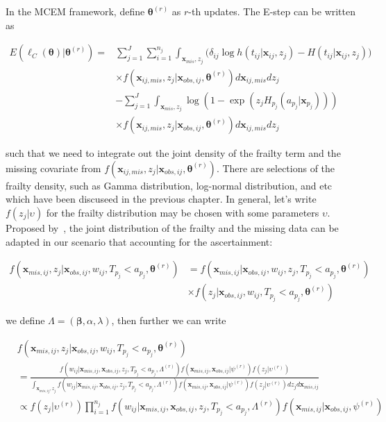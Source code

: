 \documentclass[preprint,12pt]{elsarticle}
\begin{document}
In the MCEM framework, define $\boldsymbol{\theta}^{(r)}$ as $r$-th updates. 
The E-step can be written as 

\begin{align} 
    E(\ell_C(\boldsymbol{\theta})|\boldsymbol{\theta}^{(r)})=&\sum_{j=1}^J\sum_{i=1}^{n_j}\int_{\mathbf{x}_{mis}, z_j}\Big (\delta_{ij}\log h(t_{ij}|\mathbf{x}_{ij}, z_j) - H(t_{ij}|\mathbf{x}_{ij}, z_j)\Big )\\
    &\times f(\mathbf{x}_{ij,mis}, z_j|\mathbf{x}_{obs,ij}, \boldsymbol{\theta}^{(r)})d\mathbf{x}_{ij,mis}dz_j\\
    &-\sum_{j=1}^J \int_{\mathbf{x}_{mis}, z_j} \log(1- \exp(z_j H_{p_j}(a_{p_j}|\mathbf{x}_{p_j})))\\
    &\times f(\mathbf{x}_{ij,mis}, z_j|\mathbf{x}_{obs,ij}, \boldsymbol{\theta}^{(r)})d\mathbf{x}_{ij,mis}dz_j
\end{align}

such that we need to integrate out the joint density of the frailty term and the missing covariate from $f(\mathbf{x}_{ij,mis}, z_j|\mathbf{x}_{obs,ij}, \boldsymbol{\theta}^{(r)})$. 
There are selections of the frailty density, such as Gamma distribution, log-normal distribution, and etc which have been discuseed in the previous chapter.  
In general, let's write $f(z_j|\upsilon)$ for the frailty distribution may be chosen with some parameters $\upsilon$. 
Proposed by~\citet{herring2002frailty}, the joint distribution of the frailty and the missing data can be adapted in our scenario that accounting for the ascertainment:

\begin{align} 
    f(\mathbf{x}_{mis,ij}, z_j|\mathbf{x}_{obs,ij}, w_{ij}, T_{p_j}<a_{p_j}, \boldsymbol{\theta}^{(r)})&=f(\mathbf{x}_{mis,ij}|\mathbf{x}_{obs,ij}, w_{ij}, z_j, T_{p_j}<a_{p_j}, \boldsymbol{\theta}^{(r)})\\
    &\times f(z_j|\mathbf{x}_{obs,ij}, w_{ij}, T_{p_j}<a_{p_j}, \boldsymbol{\theta}^{(r)})
\end{align}

we define $\Lambda = (\boldsymbol{\beta}, \alpha, \lambda)$, then further we can write

\begin{align} 
    &f(\mathbf{x}_{mis,ij}, z_j|\mathbf{x}_{obs,ij}, w_{ij}, T_{p_j}<a_{p_j}, \boldsymbol{\theta}^{(r)})\\
    &=\frac{f(w_{ij}|\mathbf{x}_{mis,ij}, \mathbf{x}_{obs,ij}, z_j, T_{p_j}<a_{p_j}, \Lambda^{(r)})f(\mathbf{x}_{mis,ij}, \mathbf{x}_{obs,ij}|\psi^{(r)})f(z_j|\upsilon^{(r)})}{\int_{\mathbf{x}_{mis,ij},z_j}f(w_{ij}|\mathbf{x}_{mis,ij}, \mathbf{x}_{obs,ij}, z_j, T_{p_j}<a_{p_j}, \Lambda^{(r)})f(\mathbf{x}_{mis,ij}, \mathbf{x}_{obs,ij}|\psi^{(r)})f(z_j|\upsilon^{(r)})dz_jd\mathbf{x}_{mis,ij}}\\
    &\propto f(z_j|\upsilon^{(r)})\prod_{i=1}^{n_j}f(w_{ij}|\mathbf{x}_{mis,ij}, \mathbf{x}_{obs,ij}, z_j, T_{p_j}<a_{p_j}, \Lambda^{(r)})f(\mathbf{x}_{mis,ij}|\mathbf{x}_{obs,ij}, \psi^{(r)})
\end{align}
\end{document}
